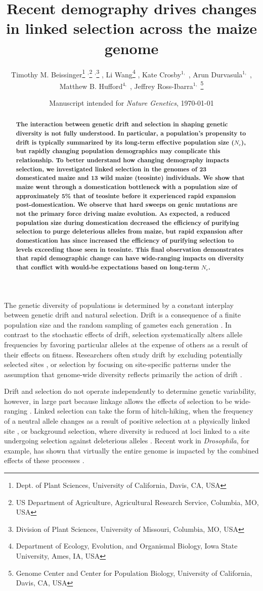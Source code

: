 \documentclass[twoside, twocolumn, letterpaper]{article}
\title{Recent demography drives changes in linked selection across the maize genome}
\author{
  Timothy M. Beissinger\thanks{Dept. of Plant Sciences, University of California, Davis, CA, USA} $^,$\thanks{US Department of Agriculture, Agricultural Research Service, Columbia, MO, USA} $^,$\thanks{Division of Plant Sciences, University of Missouri, Columbia, MO, USA} \hspace{.5mm},
  Li Wang\thanks{Department of Ecology, Evolution, and Organismal Biology, Iowa State University, Ames, IA, USA} \hspace{.5mm},
  Kate Crosby$^{1,}$ \hspace{.5mm},
  Arun Durvasula$^{1,}$ \hspace{.5mm},
  Matthew B. Hufford$^{4,}$ \hspace{.5mm},
  Jeffrey Ross-Ibarra$^{1,}$ \thanks{Genome Center and Center for Population Biology, University of California, Davis, CA, USA}
  }
\date{\small Manuscript intended for \emph{Nature Genetics}, \today}
\begin{document}
\maketitle

\begin{abstract}
  \noindent \bf
  \noindent
  The interaction between genetic drift and selection in shaping genetic diversity is not fully understood. In particular, a population's propensity to drift is typically summarized by its long-term effective population size ($N_e$), but rapidly changing population demographics may complicate this relationship. To better understand how changing demography impacts selection, we investigated linked selection in the genomes of 23 domesticated maize and 13 wild maize (teosinte) individuals. We show that maize went through a domestication bottleneck with a population size of approximately 5\% that of teosinte before it experienced rapid expansion post-domestication. We observe that hard sweeps on genic mutations are not the primary force driving maize evolution. As expected, a reduced population size during domestication decreased the efficiency of purifying selection to purge deleterious alleles from maize, but rapid expansion after domestication has since increased the efficiency of purifying selection to levels exceeding those seen in teosinte. This final observation demonstrates that rapid demographic change can have wide-ranging impacts on diversity that conflict with would-be expectations based on long-term $N_e$.
\end{abstract}

The genetic diversity of populations is determined by a constant interplay between genetic drift and natural selection. 
Drift is a consequence of a finite population size and the random sampling of gametes each generation \cite{dobzhansky1957}. 
In contrast to the stochastic effects of drift, selection systematically alters allele frequencies by favoring particular alleles at the expense of others as a result of their effects on fitness.
Researchers often study drift by excluding potentially selected sites \cite{voight2005, luikart2003, gutenkunst2009}, or selection by focusing on site-specific patterns under the assumption that genome-wide diversity reflects primarily the action of drift \cite{akey2009}.

Drift and selection do not operate independently to determine genetic variability, however, in large part because linkage allows the effects of selection to be wide-ranging \cite{smith1974, li2012,slotte2014}. 
Linked selection can take the form of hitch-hiking, when the frequency of a neutral allele changes as a result of positive selection at a physically linked site \cite{smith1974}, or background selection, where diversity is reduced at loci linked to a site undergoing selection against deleterious alleles \cite{charlesworth1993}. 
Recent work in \emph{Drosophila}, for example, has shown that virtually the entire genome is impacted by the combined effects of these processes \cite{sella2009,elyashiv2014,andolfatto2005}.
\end{document}
